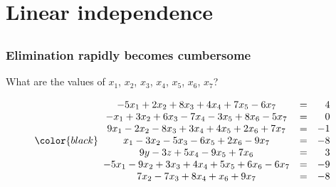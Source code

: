 \documentclass[compress]{beamer}
\newcommand{\black}[1]{{\color{black}#1}}
\newcommand{\beq}[1]{\[\black{#1}\]}
\begin{document}

\section{Linear independence}
\subsection*{}

\begin{frame}
\frametitle{Elimination rapidly becomes cumbersome}

What are the values of $x_1$, $x_2$, $x_3$, $x_4$, $x_5$, $x_6$, $x_7$?

\beq{
\begin{array}{ccr}
-5x_1 + 2x_2 + 8x_3 + 4x_4 + 7x_5 - 6x_7 &=& 4\\
-x_1 + 3x_2 + 6x_3 - 7x_4 - 3x_5 + 8x_6 - 5x_7 &=& 0\\
9x_1 - 2x_2 - 8x_3 + 3x_4 + 4x_5 + 2x_6 + 7x_7 &=& -1\\
x_1 - 3x_2 - 5x_3 - 6x_5 + 2x_6 - 9x_7 &=& -8\\
9y - 3z + 5x_4 - 9x_5 + 7x_6 &=& 3\\
-5x_1 - 9x_2 + 3x_3 + 4x_4 + 5x_5 + 6x_6 - 6x_7 &=& -9\\
7x_2 - 7x_3 + 8x_4 + x_6+ 9x_7 &=& -8\\
\end{array}
}

\end{frame}
\end{document}
